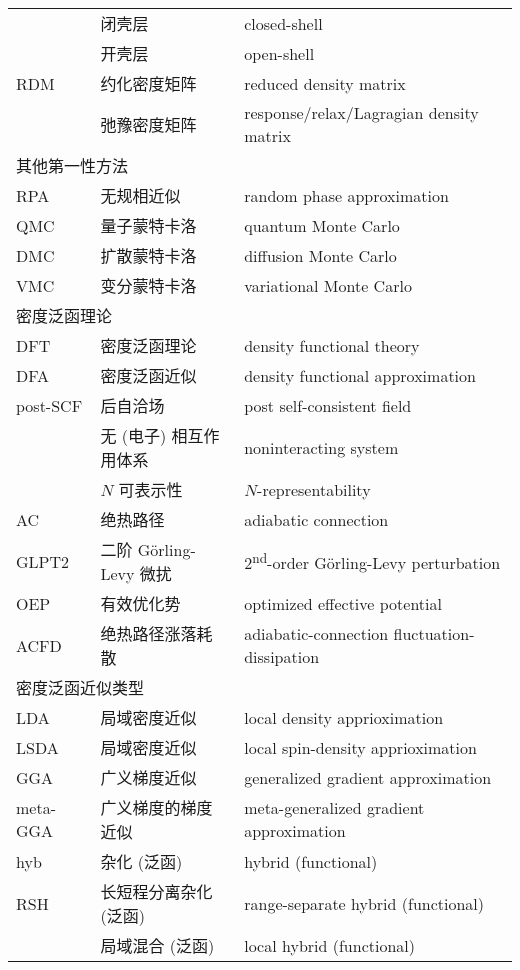 \begin{longtable}{lll}
    & 闭壳层 & closed-shell \\
    & 开壳层 & open-shell \\
    RDM & 约化密度矩阵 & reduced density matrix \\
    & 弛豫密度矩阵 & response/relax/Lagragian density matrix \\
    \midrule
    \multicolumn{3}{l}{\textsf{其他第一性方法}} \\
    RPA & 无规相近似 & random phase approximation \\
    QMC & 量子蒙特卡洛 & quantum Monte Carlo \\
    DMC & 扩散蒙特卡洛 & diffusion Monte Carlo \\
    VMC & 变分蒙特卡洛 & variational Monte Carlo \\
    \midrule
    \multicolumn{3}{l}{\textsf{密度泛函理论}} \\
    DFT & 密度泛函理论 & density functional theory \\
    DFA & 密度泛函近似 & density functional approximation \\
    post-SCF & 后自洽场 & post self-consistent field \\
    & 无 (电子) 相互作用体系 & noninteracting system \\
    & $N$ 可表示性 & $N$-representability \\
    AC & 绝热路径 & adiabatic connection \\
    GLPT2 & 二阶 G{\"o}rling-Levy 微扰 & 2\textsuperscript{nd}-order G{\"o}rling-Levy perturbation \\
    OEP & 有效优化势 & optimized effective potential \\
    ACFD & 绝热路径涨落耗散 & adiabatic-connection fluctuation-dissipation \\
    \midrule
    \multicolumn{3}{l}{\textsf{密度泛函近似类型}} \\
    LDA & 局域密度近似 & local density apprioximation \\
    LSDA & 局域密度近似 & local spin-density apprioximation \\
    GGA & 广义梯度近似 & generalized gradient approximation \\
    meta-GGA & 广义梯度的梯度近似 & meta-generalized gradient approximation \\
    hyb & 杂化 (泛函) & hybrid (functional) \\
    RSH & 长短程分离杂化 (泛函) & range-separate hybrid (functional) \\
    & 局域混合 (泛函) & local hybrid (functional) \\

\end{longtable}
